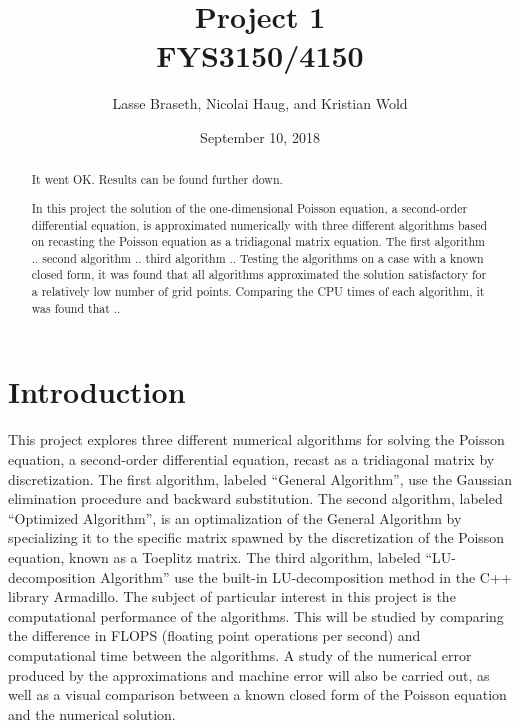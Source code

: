 \documentclass[12pt]{article}
\numberwithin{equation}{section}     %
\begin{document}
\title{Project 1\\FYS3150/4150}
\author{Lasse Braseth, Nicolai Haug, and Kristian Wold}
\date{September 10, 2018}
\maketitle

\begin{abstract}
It went OK. Results can be found further down.

In this project the solution of the one-dimensional Poisson equation, a second-order differential equation, is approximated numerically with three different algorithms based on recasting the Poisson equation as a tridiagonal matrix equation. The first algorithm .. second algorithm .. third algorithm .. Testing the algorithms on a case with a known closed form, it was found that all algorithms approximated the solution satisfactory for a relatively low number of grid points. Comparing the CPU times of each algorithm, it was found that ..
\end{abstract}

\thispagestyle{empty}
\newpage
{}

\section{Introduction}
This project explores three different numerical algorithms for solving the Poisson equation, a second-order differential equation, recast as a tridiagonal matrix by discretization. The first algorithm, labeled “General Algorithm”, use the Gaussian elimination procedure and backward substitution. The second algorithm, labeled “Optimized Algorithm”, is an optimalization of the General Algorithm by specializing it to the specific matrix spawned by the discretization of the Poisson equation, known as a Toeplitz matrix. The third algorithm, labeled “LU-decomposition Algorithm” use the built-in LU-decomposition method in the C++ library Armadillo. The subject of particular interest in this project is the computational performance of the algorithms. This will be studied by comparing the difference in FLOPS (floating point operations per second) and computational time between the algorithms. A study of the numerical error produced by the approximations and machine error will also be carried out, as well as a visual comparison between a known closed form of the Poisson equation and the numerical solution.
\end{document}
